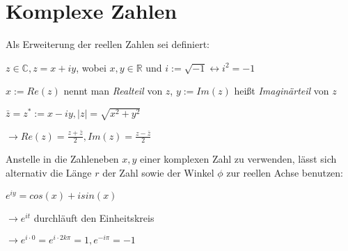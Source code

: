 \documentclass[]{article}
\begin{document}
\section{Komplexe Zahlen}

\begin{definition}
	Als Erweiterung der reellen Zahlen sei definiert:
	\begin{description}[noitemsep]
		\item $z \in \mathbb{C}, z = x + iy$, wobei $x,y \in \mathbb{R}$ und $i := \sqrt{-1} \leftrightarrow i^2 = -1$
		\item $x := Re(z)$ nennt man \emph{Realteil} von $z$, $y := Im(z)$ heißt \emph{Imaginärteil} von $z$
		\item $\bar{z} = z^* := x - iy, |z| = \sqrt{x^2 + y^2}$
		\item $\rightarrow Re(z) = \frac{z + \bar{z}}{2}, Im(z) = \frac{z - \bar{z}}{2}$
	\end{description}
\end{definition}

\begin{definition}[Polardarstellung]
	Anstelle in die Zahleneben $x,y$ einer komplexen Zahl zu verwenden, lässt sich alternativ die Länge $r$ der Zahl sowie der Winkel $\phi$ zur reellen Achse benutzen:
	
\end{definition}

\begin{satz}
	$e^{iy} = cos(x) + i sin(x)$
	
	\begin{description}[noitemsep]
		\item $\rightarrow e^{it}$ durchläuft den Einheitskreis 
		\item $\rightarrow e^{i \cdot 0} = e^{i \cdot 2k\pi} = 1, e^{-i\pi} = -1$
	\end{description}
	
\end{satz}
\end{document}
